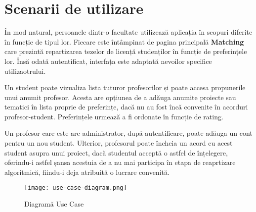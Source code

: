 \chapter{Scenarii de utilizare}

În mod natural, persoanele dintr-o facultate utilizează aplicația \thesistitle{} în scopuri diferite în funcție de tipul lor. Fiecare este întâmpinat de pagina principală \textbf{Matching} care prezintă repartizarea tezelor de licență studenților în funcție de preferințele lor. Însă odată autentificat, interfața este adaptată nevoilor specifice utilizaotrului.

Un student poate vizualiza lista tuturor profesorilor și poate accesa propunerile unui anumit profesor. Acesta are opțiunea de a adăuga anumite proiecte sau tematici în lista proprie de preferințe, dacă nu au fost încă convenite în acorduri profesor-student. Preferințele urmează a fi ordonate în funcție de rating.

Un profesor care este are administrator, după autentificare, poate adăuga un cont pentru un nou student. Ulterior, profesorul poate încheia un acord cu acest student asupra unui proiect, dacă studentul acceptă o astfel de înțelegere, oferindu-i astfel șansa acestuia de a nu mai participa în etapa de reaprtizare algoritmică, fiindu-i deja atribuită o lucrare convenită.

\begin{figure}[H]
	\centering
	\texttt{[image: use-case-diagram.png]}
	\caption{Diagramă Use Case}
\end{figure}